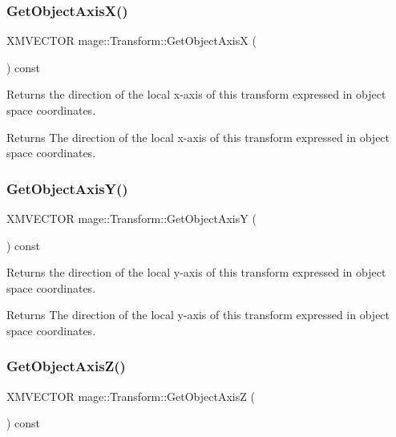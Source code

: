 \subsubsection{\texorpdfstring{Get\+Object\+Axis\+X()}{GetObjectAxisX()}}
{\footnotesize\ttfamily X\+M\+V\+E\+C\+T\+OR mage\+::\+Transform\+::\+Get\+Object\+AxisX (\begin{DoxyParamCaption}{ }\end{DoxyParamCaption}) const}

Returns the direction of the local x-\/axis of this transform expressed in object space coordinates.

\begin{DoxyReturn}{Returns}
The direction of the local x-\/axis of this transform expressed in object space coordinates. 
\end{DoxyReturn}
\hypertarget{structmage_1_1_transform_a1d2b560af18a18246186cdb8477e9019}{}\label{structmage_1_1_transform_a1d2b560af18a18246186cdb8477e9019} 
\subsubsection{\texorpdfstring{Get\+Object\+Axis\+Y()}{GetObjectAxisY()}}
{\footnotesize\ttfamily X\+M\+V\+E\+C\+T\+OR mage\+::\+Transform\+::\+Get\+Object\+AxisY (\begin{DoxyParamCaption}{ }\end{DoxyParamCaption}) const}

Returns the direction of the local y-\/axis of this transform expressed in object space coordinates.

\begin{DoxyReturn}{Returns}
The direction of the local y-\/axis of this transform expressed in object space coordinates. 
\end{DoxyReturn}
\hypertarget{structmage_1_1_transform_af6bf20352279957fdba5041074bdf9c2}{}\label{structmage_1_1_transform_af6bf20352279957fdba5041074bdf9c2} 
\subsubsection{\texorpdfstring{Get\+Object\+Axis\+Z()}{GetObjectAxisZ()}}
{\footnotesize\ttfamily X\+M\+V\+E\+C\+T\+OR mage\+::\+Transform\+::\+Get\+Object\+AxisZ (\begin{DoxyParamCaption}{ }\end{DoxyParamCaption}) const}


